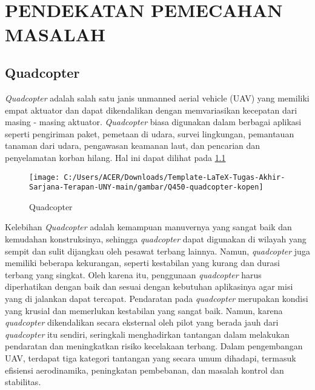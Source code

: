 
\chapter[PENDEKATAN PEMECAHAN MASALAH]{\\ PENDEKATAN PEMECAHAN MASALAH}

\section{Quadcopter}
\textit{Quadcopter} adalah salah satu janis unmanned aerial vehicle (UAV) yang memiliki empat aktuator dan dapat dikendalikan dengan memvariasikan kecepatan dari masing - masing aktuator. \textit{Quadcopter} biasa digunakan dalam berbagai aplikasi seperti pengiriman paket, pemetaan di udara, survei lingkungan, pemantauan tanaman dari udara, pengawasan keamanan laut, dan pencarian dan penyelamatan korban hilang. Hal ini dapat dilihat pada \cref{fig:q450-quadcopter-kopen}

\begin{figure}[H]
	\centering
	\texttt{[image: C:/Users/ACER/Downloads/Template-LaTeX-Tugas-Akhir-Sarjana-Terapan-UNY-main/gambar/Q450-quadcopter-kopen]}
	\caption{Quadcopter}
	\label{fig:q450-quadcopter-kopen}
\end{figure}


Kelebihan \textit{Quadcopter} adalah kemampuan manuvernya yang sangat baik dan kemudahan konstruksinya, sehingga \textit{quadcopter} dapat digunakan di wilayah yang sempit dan sulit dijangkau oleh pesawat terbang lainnya\cite{priansyah2016single}. Namun, \textit{quadcopter} juga memiliki beberapa kekurangan, seperti kestabilan yang kurang dan durasi terbang yang singkat. Oleh karena itu, penggunaan \textit{quadcopter} harus diperhatikan dengan baik dan sesuai dengan kebutuhan aplikasinya agar misi yang di jalankan dapat tercapat. Pendaratan pada \textit{quadcopter} merupakan kondisi yang krusial dan memerlukan kestabilan yang sangat baik. Namun, karena \textit{quadcopter} dikendalikan secara eksternal oleh pilot yang berada jauh dari \textit{quadcopter} itu sendiri, seringkali menghadirkan tantangan dalam melakukan pendaratan dan meningkatkan risiko kecelakaan terbang. Dalam pengembangan UAV, terdapat tiga kategori tantangan yang secara umum dihadapi, termasuk efisiensi aerodinamika, peningkatan pembebanan, dan masalah kontrol dan stabilitas.


